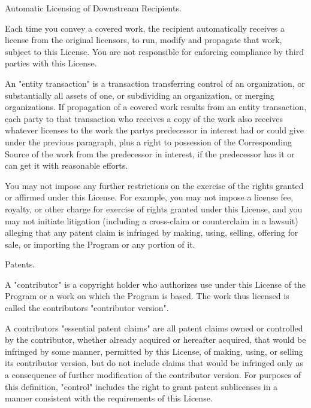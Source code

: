 \begin{DoxyEnumerate}
\item Automatic Licensing of Downstream Recipients.
\end{DoxyEnumerate}

Each time you convey a covered work, the recipient automatically receives a license from the original licensors, to run, modify and propagate that work, subject to this License. You are not responsible for enforcing compliance by third parties with this License.

An "{}entity transaction"{} is a transaction transferring control of an organization, or substantially all assets of one, or subdividing an organization, or merging organizations. If propagation of a covered work results from an entity transaction, each party to that transaction who receives a copy of the work also receives whatever licenses to the work the party\textquotesingle{}s predecessor in interest had or could give under the previous paragraph, plus a right to possession of the Corresponding Source of the work from the predecessor in interest, if the predecessor has it or can get it with reasonable efforts.

You may not impose any further restrictions on the exercise of the rights granted or affirmed under this License. For example, you may not impose a license fee, royalty, or other charge for exercise of rights granted under this License, and you may not initiate litigation (including a cross-\/claim or counterclaim in a lawsuit) alleging that any patent claim is infringed by making, using, selling, offering for sale, or importing the Program or any portion of it.


\begin{DoxyEnumerate}
\item Patents.
\end{DoxyEnumerate}

A "{}contributor"{} is a copyright holder who authorizes use under this License of the Program or a work on which the Program is based. The work thus licensed is called the contributor\textquotesingle{}s "{}contributor version"{}.

A contributor\textquotesingle{}s "{}essential patent claims"{} are all patent claims owned or controlled by the contributor, whether already acquired or hereafter acquired, that would be infringed by some manner, permitted by this License, of making, using, or selling its contributor version, but do not include claims that would be infringed only as a consequence of further modification of the contributor version. For purposes of this definition, "{}control"{} includes the right to grant patent sublicenses in a manner consistent with the requirements of this License.

